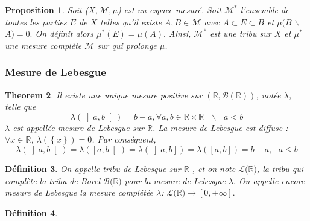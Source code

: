 \documentclass[3pt]{article}
\newtheorem{theorem}{Theorem}
\newtheorem{definition}[theorem]{D\'{e}finition}
\newtheorem{proposition}[theorem]{Proposition}
\begin{document}
\begin{proposition}
Soit ($X,\mathcal{M},\mu $) est un espace mesur\'{e}. Soit $\mathcal{M}%
^{\ast }$ l'ensemble de toutes les parties $E$ de $X$ telles qu'il existe $%
A,B\in \mathcal{M}$ avec $A\subset E\subset B$ et $\mu (B$ $\backslash $ $%
A)=0.$ On d\'{e}finit alors $\mu ^{\ast }(E)=\mu (A).$ Ainsi, $\mathcal{M}%
^{\ast }$ est une tribu sur $X$ et $\mu ^{\ast }$ une mesure compl\`{e}te $%
\mathcal{M}$ sur qui prolonge $\mu $.
\end{proposition}

\subsubsection{Mesure de Lebesgue}

\bigskip

\begin{theorem}
Il existe une unique mesure positive sur $(\mathbb{R},\mathcal{B(\mathbb{R})}%
)$, not\'{e}e $\lambda $, telle que 
\begin{equation*}
\lambda (\left] a,b\right[ )=b-a,\forall a,b\in \mathbb{R}\times \mathbb{R}%
\text{ }\backslash \text{ }a<b
\end{equation*}%
$\lambda $ est appell\'{e}e mesure de Lebesgue sur $\mathbb{R}$. La mesure
de Lebesgue est diffuse : $\forall x\in \mathbb{R}$, $\lambda (\left\{
x\right\} )=0$. Par cons\'{e}quent,%
\begin{equation*}
\lambda (\left] a,b\right[ )=\lambda (\left[ a,b\right[ )=\lambda (\left] a,b%
\right] )=\lambda (\left[ a,b\right] )=b-a,\text{ }a\leq b
\end{equation*}
\end{theorem}

\bigskip 

\begin{definition}
On appelle tribu de Lebesque sur $\mathbb{R}$ , et on note $\mathcal{L(}%
\mathbb{R}\mathcal{)}$, la tribu qui compl\`{e}te la tribu de Borel $%
\mathcal{B(}\mathbb{R}\mathcal{)}$ pour la mesure de Lebesgue $\lambda .$ On
appelle encore mesure de Lebesgue la mesure compl\'{e}t\'{e}e $\lambda $: $%
\mathcal{L(}\mathbb{R}\mathcal{)\rightarrow }\left[ 0,+\infty \right] .$
\end{definition}

\bigskip 

\begin{definition}
\end{definition}

\bigskip 
\end{document}
